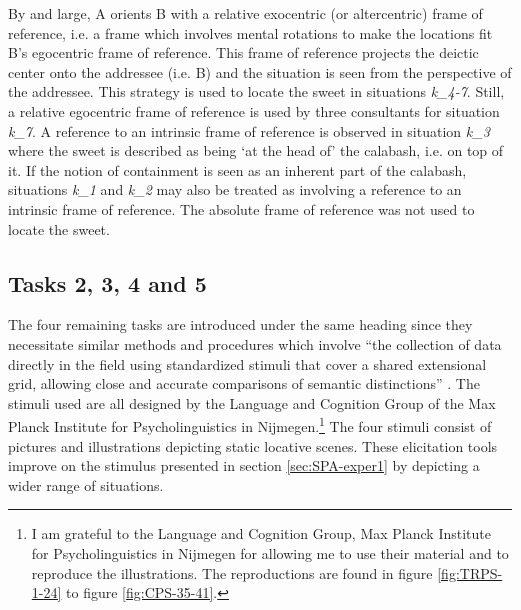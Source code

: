 By and large,  A orients B with a relative exocentric (or
altercentric) frame of reference, i.e.  a frame which involves
 mental rotations to make the locations fit B's egocentric frame of reference.
This frame of reference projects the deictic center onto the
addressee (i.e. B) and the situation is seen  from the perspective of
the addressee. This strategy is used to locate the sweet in situations  {\it
k_{4-7}}.
Still, a relative egocentric frame of reference is used by three consultants for
situation {\it k_{7}}.  A reference to an intrinsic frame of reference is
observed in situation {\it k_{3}} where the sweet is described as being  `at the
head of' the calabash, i.e. on top of it. If the notion of containment is
seen as an inherent
part of the calabash, situations  {\it k_{1}} and {\it k_{2}} may also be
treated as involving a reference to an intrinsic frame of reference. The
absolute
frame of reference was not used to locate the sweet.
 


\subsection{Tasks 2, 3, 4 and 5}
\label{sec:SPA-exper2-3}


The four remaining tasks are introduced under  the same heading since they
necessitate  similar methods and  procedures which involve  ``the collection of
data directly in the field using standardized stimuli that cover a shared
extensional grid, allowing close and accurate comparisons of semantic
distinctions'' \citep[860]{Amek07b}.    The stimuli used are all designed by the
Language and Cognition Group of the Max Planck Institute for Psycholinguistics
in Nijmegen.\footnote{I am grateful to the Language and Cognition Group, Max
Planck Institute for
Psycholinguistics in Nijmegen for allowing me to use  
their material and to reproduce the illustrations. The reproductions are found
in
 figure \ref{fig:TRPS-1-24} to figure  \ref{fig:CPS-35-41}.} The four stimuli
consist of
pictures and illustrations
depicting static locative scenes. These elicitation tools improve  on the
stimulus presented in
section \ref{sec:SPA-exper1} by depicting a wider range of situations. 




